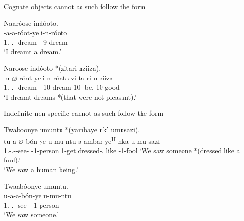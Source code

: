 \documentclass[output=paper]{langscibook}
\begin{document}
\ea
\label{bkm:Ref75772356}
Cognate objects cannot as such follow the \CJ{} form\\
\ea
\begin{xlist}
\exi{\DJ{}}
Naaróose indóoto.\\
\gll
\N{}-a-a-róot-ye  i-n-róoto\\
1\SG.\SM-\N.\PST-\DJ{}-dream-\PFV{}  \AUG{}-9-dream\\
\glt
‘I dreamt a dream.’\\

\end{xlist}

\ex
\begin{xlist}
\exi{\CJ{}}
Naroose indóoto *(zitari nziiza).\\
\gll
\N{}-a-$\varnothing$-róot-ye  i-n-róoto  zi-ta-ri  n-ziiza\\
1\SG.\SM-\N.\PST-\CJ{}-dream-\PFV{}  \AUG{}-10-dream  10\SM-\NEG{}-be.\REL{}  10-good\\
\glt
‘I dreamt dreams *(that were not pleasant).’\\

\end{xlist}

\z
\z

\ea
Indefinite non-specific cannot as such follow the \CJ{} form\\
\ea
\begin{xlist}
\exi{\CJ}
Twaboonye umuntu *(yambaye nk’ umusazi).\\
\gll
tu-a-$\varnothing$-bón-ye  u-mu-ntu  a-ambar-ye\textsuperscript{H} nka  u-mu-sazi \\
1\PL.\SM{}-\N.\PST-\CJ{}-see-\PFV{}  \AUG{}-1-person  1\SM{}-get.dressed-\PFV{}.\REL{} like  \AUG{}-1-fool ‘We saw someone *(dressed like a fool).’\\
\glt
‘We saw a human being.’\\
\end{xlist}

\ex
\begin{xlist}
\exi{\DJ{}}
Twaabóonye umuntu.\\
\gll
u-a-a-bón-ye  u-mu-ntu\\
1\PL.\SM-\N.\PST-\DJ{}-see-\PFV{}  \AUG{}-1-person\\
\glt
‘We saw someone.’\\

\end{xlist}
\end{document}
